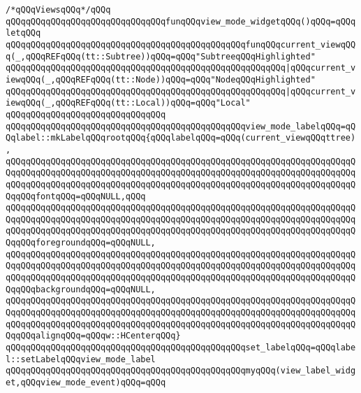\verb|/*qQQqViewsqQQq*/qQQq|\newline
\newline
\verb|qQQqqQQqqQQqqQQqqQQqqQQqqQQqqQQqfunqQQqview_mode_widgetqQQq()qQQq=qQQqletqQQq|\newline
\newline
\verb|qQQqqQQqqQQqqQQqqQQqqQQqqQQqqQQqqQQqqQQqqQQqqQQqfunqQQqcurrent_viewqQQq(_,qQQqREFqQQq(tt::Subtree))qQQq=qQQq"SubtreeqQQqHighlighted"|\newline
\verb|qQQqqQQqqQQqqQQqqQQqqQQqqQQqqQQqqQQqqQQqqQQqqQQqqQQqqQQq|\verb#|qQQqcurrent_viewqQQq(_,qQQqREFqQQq(tt::Node))qQQq=qQQq"NodeqQQqHighlighted"#\newline
\verb|qQQqqQQqqQQqqQQqqQQqqQQqqQQqqQQqqQQqqQQqqQQqqQQqqQQqqQQq|\verb#|qQQqcurrent_viewqQQq(_,qQQqREFqQQq(tt::Local))qQQq=qQQq"Local"#\newline
\verb|qQQqqQQqqQQqqQQqqQQqqQQqqQQqqQQq|\newline
\verb|qQQqqQQqqQQqqQQqqQQqqQQqqQQqqQQqqQQqqQQqqQQqqQQqview_mode_labelqQQq=qQQqlabel::mkLabelqQQqrootqQQq{qQQqlabelqQQq=qQQq(current_viewqQQqttree),|\newline
\verb|qQQqqQQqqQQqqQQqqQQqqQQqqQQqqQQqqQQqqQQqqQQqqQQqqQQqqQQqqQQqqQQqqQQqqQQqqQQqqQQqqQQqqQQqqQQqqQQqqQQqqQQqqQQqqQQqqQQqqQQqqQQqqQQqqQQqqQQqqQQqqQQqqQQqqQQqqQQqqQQqqQQqqQQqqQQqqQQqqQQqqQQqqQQqqQQqqQQqqQQqqQQqqQQqqQQqqQQqfontqQQq=qQQqNULL,qQQq|\newline
\verb|qQQqqQQqqQQqqQQqqQQqqQQqqQQqqQQqqQQqqQQqqQQqqQQqqQQqqQQqqQQqqQQqqQQqqQQqqQQqqQQqqQQqqQQqqQQqqQQqqQQqqQQqqQQqqQQqqQQqqQQqqQQqqQQqqQQqqQQqqQQqqQQqqQQqqQQqqQQqqQQqqQQqqQQqqQQqqQQqqQQqqQQqqQQqqQQqqQQqqQQqqQQqqQQqqQQqqQQqforegroundqQQq=qQQqNULL,|\newline
\verb|qQQqqQQqqQQqqQQqqQQqqQQqqQQqqQQqqQQqqQQqqQQqqQQqqQQqqQQqqQQqqQQqqQQqqQQqqQQqqQQqqQQqqQQqqQQqqQQqqQQqqQQqqQQqqQQqqQQqqQQqqQQqqQQqqQQqqQQqqQQqqQQqqQQqqQQqqQQqqQQqqQQqqQQqqQQqqQQqqQQqqQQqqQQqqQQqqQQqqQQqqQQqqQQqqQQqqQQqbackgroundqQQq=qQQqNULL,|\newline
\verb|qQQqqQQqqQQqqQQqqQQqqQQqqQQqqQQqqQQqqQQqqQQqqQQqqQQqqQQqqQQqqQQqqQQqqQQqqQQqqQQqqQQqqQQqqQQqqQQqqQQqqQQqqQQqqQQqqQQqqQQqqQQqqQQqqQQqqQQqqQQqqQQqqQQqqQQqqQQqqQQqqQQqqQQqqQQqqQQqqQQqqQQqqQQqqQQqqQQqqQQqqQQqqQQqqQQqqQQqalignqQQq=qQQqw::HCenterqQQq}|\newline
\newline
\verb|qQQqqQQqqQQqqQQqqQQqqQQqqQQqqQQqqQQqqQQqqQQqqQQqset_labelqQQq=qQQqlabel::setLabelqQQqview_mode_label|\newline
\verb|qQQqqQQqqQQqqQQqqQQqqQQqqQQqqQQqqQQqqQQqqQQqqQQqmyqQQq(view_label_widget,qQQqview_mode_event)qQQq=qQQq|\newline
